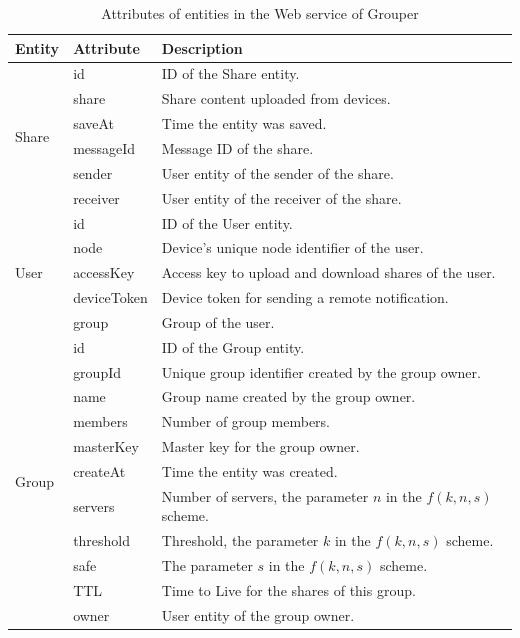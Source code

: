 \documentclass[a4paper,11pt]{report}
\begin{document}
\begin{table}[t]
	\centering
	\caption{Attributes of entities in the Web service of Grouper}
	\label{table:entity_attributes}
	\begin{tabular}{@{}lll@{}}
		\toprule
		\textbf{Entity} & \textbf{Attribute} & \textbf{Description} \\ \midrule
		\multirow{6}{*}{Share} & id & ID of the Share entity. \\
		& share & Share content uploaded from devices. \\ 
		& saveAt & Time the entity was saved. \\
		& messageId & Message ID of the share.\\
		& sender & User entity of the sender of the share. \\
		& receiver & User entity of the receiver of the share.  \\
		\hline
		\multirow{5}{*}{User} & id & ID of the User entity. \\
		& node & Device's unique node identifier of the user. \\
		& accessKey & Access key to upload and download shares of the user. \\
		& deviceToken & Device token for sending a remote notification. \\
		& group & Group of the user.  \\
		\hline
		\multirow{11}{*}{Group} & id & ID of the Group entity. \\
		& groupId & Unique group identifier created by the group owner. \\
		& name & Group name created by the group owner. \\
		& members & Number of group members. \\
		& masterKey & Master key for the group owner. \\
		& createAt & Time the entity was created. \\
		& servers & Number of servers, the parameter $n$ in the $f(k, n, s)$ scheme. \\
		& threshold & Threshold, the parameter $k$ in the $f(k, n, s)$ scheme. \\
		& safe & The parameter $s$ in the $f(k, n, s)$ scheme.  \\
		& TTL & Time to Live for the shares of this group.  \\
		& owner & User entity of the group owner. \\ 
		\bottomrule
	\end{tabular}
\end{table}
\end{document}
